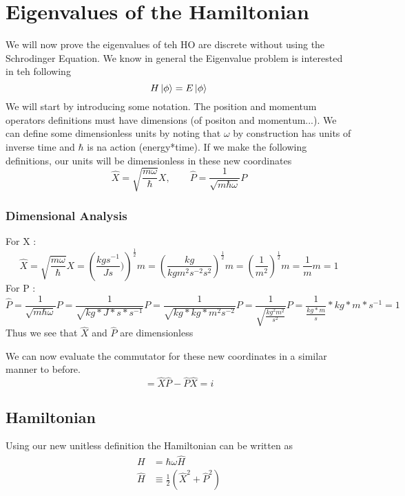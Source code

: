 \documentclass{article}
\newcommand{\be}{\begin{equation}}
\newcommand{\ee}{\end{equation}}
\begin{document}
\section*{Eigenvalues of the Hamiltonian}
We will now prove the eigenvalues of teh HO are discrete without using the Schrodinger Equation. 
We know in general the Eigenvalue problem is interested in teh following 
\be
H\ket{\phi} = E\ket{\phi}
\ee
We will start by introducing some notation. 
The position and momentum operators definitions must have dimensions (of positon and momentum...).
We can define some dimensionless units by noting that $\omega$ by construction has units of inverse time and $\hbar$ is na action (energy*time).
If we make the following definitions, our units will be dimensionless in these new coordinates
\be
\hat{X} = \sqrt{\frac{m\omega}{\hbar}}X, \qquad \hat{P} = \frac{1}{\sqrt{m\hbar \omega}} P
\ee

\subsubsection*{Dimensional Analysis}
For X :
\be
\hat{X}=\sqrt{\frac{m\omega}{\hbar}}X=\left(\frac{kgs^{-1}}{Js})\right)^{\frac{1}{2}}m = \left(\frac{kg}{kgm^{2}s^{-2}s^{2}}\right)^{\frac{1}{2}}m = \left(\frac{1}{m^2}\right)^{\frac{1}{2}} m = \frac{1}{m}m = 1
\ee
For P :
\be
\hat{P} = \frac{1}{\sqrt{m\hbar \omega}} P = \frac{1}{\sqrt{kg *J*s*s^{-1}}} P = \frac{1}{\sqrt{kg*kg*m^2s^{-2}}} P = \frac{1}{\sqrt{\frac{kg^2m^2}{s^2}}} P = \frac{1}{\frac{kg*m}{s}}*kg*m*s^{-1} = 1
\ee
Thus we see that $\hat{X}$ and $\hat{P}$ are dimensionless

We can now evaluate the commutator for these new coordinates in a similar manner to before. 
\be
[\hat{X},\hat{P}] = \hat{X}\hat{P} - \hat{P}\hat{X} = i
\ee

\subsection*{Hamiltonian}
Using our new unitless definition the Hamiltonian can be written as 
\be
\begin{split}
    H &= \hbar \omega \hat{H}\\
    \hat{H} &\equiv \frac{1}{2}\left(\hat{X}^2 + \hat{P}^2\right)
\end{split}
\ee
\end{document}
